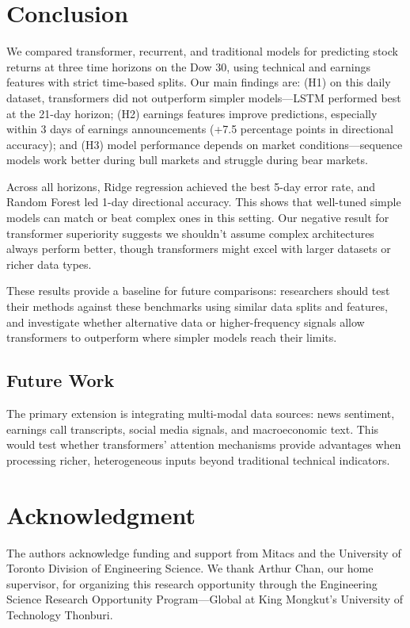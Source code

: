 \documentclass[conference,a4paper]{IEEEtran}
\begin{document}
\section{Conclusion}
We compared transformer, recurrent, and traditional models for predicting stock returns at three time horizons on the Dow 30, using technical and earnings features with strict time-based splits. Our main findings are: (H1) on this daily dataset, transformers did not outperform simpler models—LSTM performed best at the 21-day horizon; (H2) earnings features improve predictions, especially within 3 days of earnings announcements (+7.5 percentage points in directional accuracy); and (H3) model performance depends on market conditions—sequence models work better during bull markets and struggle during bear markets.

Across all horizons, Ridge regression achieved the best 5-day error rate, and Random Forest led 1-day directional accuracy. This shows that well-tuned simple models can match or beat complex ones in this setting. Our negative result for transformer superiority suggests we shouldn't assume complex architectures always perform better, though transformers might excel with larger datasets or richer data types.

These results provide a baseline for future comparisons: researchers should test their methods against these benchmarks using similar data splits and features, and investigate whether alternative data or higher-frequency signals allow transformers to outperform where simpler models reach their limits.


\subsection*{Future Work}
The primary extension is integrating multi-modal data sources: news sentiment, earnings call transcripts, social media signals, and macroeconomic text. This would test whether transformers' attention mechanisms provide advantages when processing richer, heterogeneous inputs beyond traditional technical indicators.

\section*{Acknowledgment}
The authors acknowledge funding and support from Mitacs and the University of Toronto Division of Engineering Science. We thank Arthur Chan, our home supervisor, for organizing this research opportunity through the Engineering Science Research Opportunity Program---Global at King Mongkut's University of Technology Thonburi.
\end{document}
